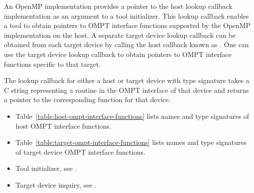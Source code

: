 \descr

An OpenMP implementation provides a pointer to the host lookup callback 
implementation as an argument to a tool initializer. This lookup callback
enables a tool to obtain pointers to OMPT interface functions supported by the 
OpenMP implementation on the host. 
A separate target device lookup callback can be obtained from each target device 
by calling the host callback known as . One can use the
target device lookup callback to 
obtain pointers to OMPT interface functions specific to that target.

\constraints
The lookup callback for either a host or target device with type
signature  takes a C string
representing a routine in the OMPT interface of that device and
returns a pointer to the corresponding function for that device.

\crossreferences
\begin{itemize}
\item Table~\ref{table:host-ompt-interface-functions} 
lists names and type signatures of
host OMPT interface functions. 
\item Table~\ref{table:target-ompt-interface-functions} lists 
names and type signatures of target device OMPT interface functions.
\item Tool initializer, see .
\item Target device inquiry, see .
\end{itemize}

